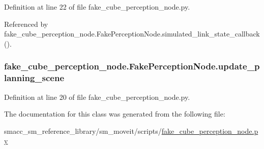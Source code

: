Definition at line 22 of file fake\+\_\+cube\+\_\+perception\+\_\+node.\+py.



Referenced by fake\+\_\+cube\+\_\+perception\+\_\+node.\+Fake\+Perception\+Node.\+simulated\+\_\+link\+\_\+state\+\_\+callback().

\subsubsection[{\texorpdfstring{update\+\_\+planning\+\_\+scene}{update_planning_scene}}]{\setlength{\rightskip}{0pt plus 5cm}fake\+\_\+cube\+\_\+perception\+\_\+node.\+Fake\+Perception\+Node.\+update\+\_\+planning\+\_\+scene}\hypertarget{classfake__cube__perception__node_1_1FakePerceptionNode_a67b87c9f077aefedf69f3e6d9b29ea94}{}\label{classfake__cube__perception__node_1_1FakePerceptionNode_a67b87c9f077aefedf69f3e6d9b29ea94}


Definition at line 20 of file fake\+\_\+cube\+\_\+perception\+\_\+node.\+py.



The documentation for this class was generated from the following file\+:\begin{DoxyCompactItemize}
\item 
smacc\+\_\+sm\+\_\+reference\+\_\+library/sm\+\_\+moveit/scripts/\hyperlink{fake__cube__perception__node_8py}{fake\+\_\+cube\+\_\+perception\+\_\+node.\+py}\end{DoxyCompactItemize}
